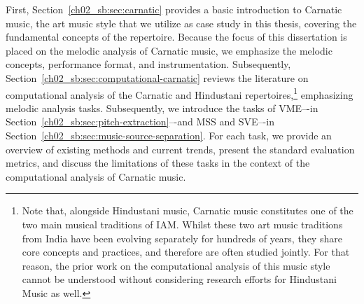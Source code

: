 First, Section~\ref{ch02_sb:sec:carnatic} provides a basic introduction to Carnatic music, the art music style that we utilize as case study in this thesis, covering the fundamental concepts of the repertoire. Because the focus of this dissertation is placed on the melodic analysis of Carnatic music, we emphasize the melodic concepts, performance format, and instrumentation.
%
Subsequently, Section~\ref{ch02_sb:sec:computational-carnatic} reviews the literature on computational analysis of the Carnatic and Hindustani repertoires,\footnote{Note that, alongside Hindustani music, Carnatic music constitutes one of the two main musical traditions of \acrfull{IAM}. Whilst these two art music traditions from India have been evolving separately for hundreds of years, they share core concepts and practices, and therefore are often studied jointly. For that reason, the prior work on the computational analysis of this music style cannot be understood without considering research efforts for Hindustani Music as well.} emphasizing melodic analysis tasks. Subsequently, we introduce the tasks of \acrfull{VME}–-in Section~\ref{ch02_sb:sec:pitch-extraction}–-and \acrfull{MSS} and \acrfull{SVE}–-in Section~\ref{ch02_sb:sec:music-source-separation}. For each task, we provide an overview of existing methods and current trends, present the standard evaluation metrics, and discuss the limitations of these tasks in the context of the computational analysis of Carnatic music.


%



